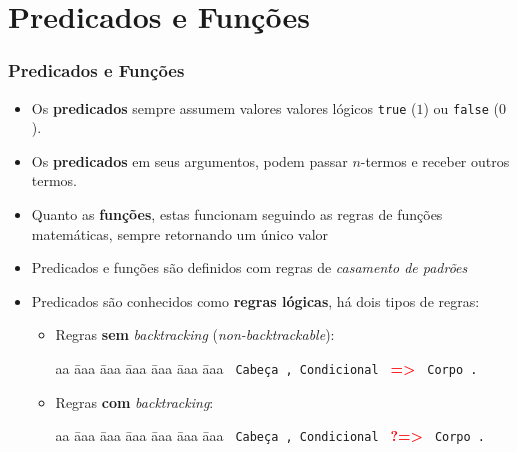 \section{Predicados e Funções}


\begin{frame}[fragile,allowframebreaks=0.8,c]
	\frametitle{Predicados e Funções}
    
\begin{itemize}

\item Os \textbf{predicados} sempre assumem valores valores lógicos \texttt{true} ($1$) ou \texttt{false} ($0$).

\item Os \textbf{predicados} em seus argumentos, podem passar $n$-termos e receber
outros termos.

\item Quanto as \textbf{funções}, estas funcionam seguindo as regras de funções matemáticas,
sempre retornando um único valor

\item Predicados e funções são definidos com regras de \textit{casamento de padrões}


\item Predicados são conhecidos como \textbf{regras lógicas}, há dois tipos de regras:
\framebreak        
        \begin{itemize}
            \item Regras \textbf{sem} {\em backtracking} (\textit{non-backtrackable}):
        	
            \begin{tabbing}
              aa \= aaa \= aaa \= aaa \= aaa \= aaa \= aaa \kill
             \> \> \verb+ Cabeça , Condicional + \textbf{\textcolor{red}{=>}} \verb+ Corpo .+
            \end{tabbing}
            

            \item Regras \textbf{com} {\em backtracking}:
            
            \begin{tabbing}
              aa \= aaa \= aaa \= aaa \= aaa \= aaa \= aaa \kill
             \> \> \verb+ Cabeça , Condicional + \textbf{\textcolor{red}{?=>}} \verb+ Corpo .+
            \end{tabbing}
        
        \end{itemize}
\framebreak        
       

\end{itemize}
\end{frame}
